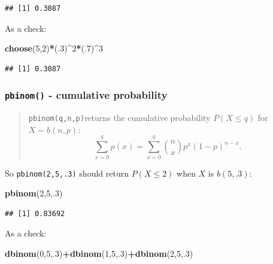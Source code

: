 \documentclass[
]{book}
\newenvironment{Shaded}{\begin{snugshade}}{\end{snugshade}}
\newcommand{\DecValTok}[1]{\textcolor[rgb]{0.00,0.00,0.81}{#1}}
\newcommand{\FunctionTok}[1]{\textcolor[rgb]{0.13,0.29,0.53}{\textbf{#1}}}
\newcommand{\NormalTok}[1]{#1}
\newcommand{\SpecialCharTok}[1]{\textcolor[rgb]{0.81,0.36,0.00}{\textbf{#1}}}
\theoremstyle{definition}
\theoremstyle{definition}
\theoremstyle{definition}
\theoremstyle{definition}
\theoremstyle{remark}
\begin{document}
\begin{verbatim}
## [1] 0.3087
\end{verbatim}

As a check:

\begin{Shaded}
\begin{Highlighting}[]
\FunctionTok{choose}\NormalTok{(}\DecValTok{5}\NormalTok{,}\DecValTok{2}\NormalTok{)}\SpecialCharTok{*}\NormalTok{(.}\DecValTok{3}\NormalTok{)}\SpecialCharTok{\^{}}\DecValTok{2}\SpecialCharTok{*}\NormalTok{(.}\DecValTok{7}\NormalTok{)}\SpecialCharTok{\^{}}\DecValTok{3}
\end{Highlighting}
\end{Shaded}

\begin{verbatim}
## [1] 0.3087
\end{verbatim}

\subsubsection{\texorpdfstring{\texttt{pbinom()} - cumulative probability}{pbinom() - cumulative probability}}\label{pbinom---cumulative-probability}

\begin{quote}
\texttt{pbinom(q,n,p)}returns the cumulative probability \(P(X \leq q)\) for \(X \sim b(n,p)\): \[\sum_{x=0}^q p(x)=\sum_{x=0}^q\binom{n}{x}p^x(1-p)^{n-x}.\]
\end{quote}

So \texttt{pbinom(2,5,.3)} should return \(P(X \leq 2)\) when \(X\) is \(b(5,.3)\):

\begin{Shaded}
\begin{Highlighting}[]
\FunctionTok{pbinom}\NormalTok{(}\DecValTok{2}\NormalTok{,}\DecValTok{5}\NormalTok{,.}\DecValTok{3}\NormalTok{)}
\end{Highlighting}
\end{Shaded}

\begin{verbatim}
## [1] 0.83692
\end{verbatim}

As a check:

\begin{Shaded}
\begin{Highlighting}[]
\FunctionTok{dbinom}\NormalTok{(}\DecValTok{0}\NormalTok{,}\DecValTok{5}\NormalTok{,.}\DecValTok{3}\NormalTok{)}\SpecialCharTok{+}\FunctionTok{dbinom}\NormalTok{(}\DecValTok{1}\NormalTok{,}\DecValTok{5}\NormalTok{,.}\DecValTok{3}\NormalTok{)}\SpecialCharTok{+}\FunctionTok{dbinom}\NormalTok{(}\DecValTok{2}\NormalTok{,}\DecValTok{5}\NormalTok{,.}\DecValTok{3}\NormalTok{)}
\end{Highlighting}
\end{Shaded}
\end{document}
